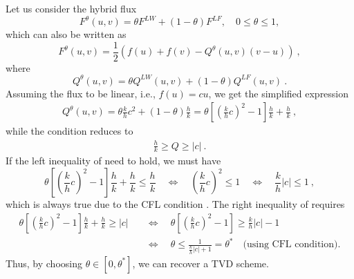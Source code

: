 \documentclass{article}
\begin{document}
\begin{exerciseList}
\begin{enumerate}
\end{enumerate}

\item Let us consider the hybrid flux 
\[
F^\theta(u,v) = \theta F^{LW} + (1-\theta) F^{LF}, \quad 0 \leq \theta \leq 1,
\]
which can also be written as
\[
F^\theta(u,v) = \frac{1}{2} \left( f(u) + f(v) - Q^\theta(u,v) (v-u)\right) \ , 
\]
where
\[
Q^\theta(u,v) = \theta Q^{LW}(u,v) + (1-\theta) Q^{LF}(u,v)\ .
\]
Assuming the flux to be linear, i.e., $f(u) = cu$, we get the simplified expression
\begin{gather} \label{hybQ}
Q^\theta(u,v) = \theta \frac{k}{h} c^2 + (1-\theta) \frac{h}{k} = \theta\left[ \left(\frac{k}{h} c\right)^2 - 1\right]\frac{h}{k} + \frac{h}{k}\ ,
\end{gather}
while the condition  reduces to 
\begin{gather} \label{1n2n3_lin}
\frac{h}{k} \geq Q \geq |c|\ .
\end{gather}
If the left inequality of  need to hold, we must have
\[
\theta\left[ \left(\frac{k}{h} c\right)^2 - 1\right]\frac{h}{k} + \frac{h}{k} \leq \frac{h}{k} \quad \iff \quad \left(\frac{k}{h} c\right)^2 \leq 1 \quad \iff \quad \frac{k}{h} |c| \leq 1\ ,
\]
which is always true due to the CFL condition . The right inequality of  requires
\begin{align*}
\theta\left[ \left(\frac{k}{h} c\right)^2 - 1\right]\frac{h}{k} + \frac{h}{k} \geq |c| &\quad \iff \quad \theta\left[ \left(\frac{k}{h} c\right)^2 - 1\right]\geq \frac{k}{h} |c| -1 \\
&\quad \iff \quad \theta \leq \frac{1}{\frac{k}{h} |c| + 1} = \theta^* \quad \text{(using CFL condition)}.
\end{align*}
Thus, by choosing $\theta \in [0,\theta^*]$, we can recover a TVD scheme.

\end{exerciseList}



\newpage
\end{document}
